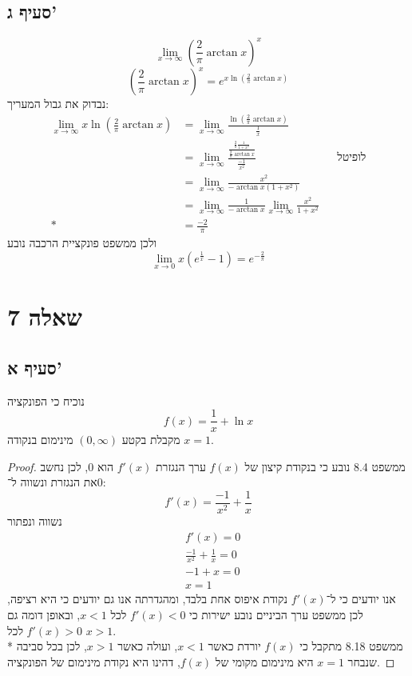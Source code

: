 \subsection{סעיף ג'}
\[
	\lim_{x \to \infty} {\left( \frac{2}{\pi} \arctan x \right)}^x
\]
\[
	{\left( \frac{2}{\pi} \arctan x \right)}^x
	= e^{x \ln \left( \frac{2}{\pi} \arctan x \right)}
\]
נבדוק את גבול המעריך:
\begin{align*}
	\lim_{x \to \infty} x \ln \left( \frac{2}{\pi} \arctan x \right)
	& = \lim_{x \to \infty} \frac{\ln \left( \frac{2}{\pi} \arctan x \right)}{\frac{1}{x}} \\
	& = \lim_{x \to \infty} \frac{\frac{\frac{2}{\pi} \frac{1}{1 + x^2}}{\frac{2}{\pi} \arctan x}}{\frac{-1}{x^2}} && \text{לופיטל} \\
	& = \lim_{x \to \infty} \frac{x^2}{-\arctan x (1 + x^2)} \\
	& = \lim_{x \to \infty} \frac{1}{-\arctan x } \lim_{x \to \infty} \frac{x^2}{1 + x^2} \\*
	& = \frac{-2}{\pi}
\end{align*}
ולכן ממשפט פונקציית הרכבה נובע
\[
	\lim_{x \to 0} x (e^\frac{1}{x} - 1) = e^{-\frac{2}{\pi}}
\]

\section{שאלה 7}
\subsection{סעיף א'}
נוכיח כי הפונקציה
\[
	f(x) = \frac{1}{x} + \ln x
\]
מקבלת בקטע $(0, \infty)$ מינימום בנקודה $x = 1$.
\begin{proof}
	ממשפט 8.4 נובע כי בנקודת קיצון של $f(x)$ ערך הנגזרת $f'(x)$ הוא $0$, לכן נחשב את הנגזרת ונשווה ל־$0$:
	\[
		f'(x) = \frac{-1}{x^2} + \frac{1}{x}
	\]
	נשווה ונפתור
	\begin{align*}
		& f'(x) = 0 \\
		& \frac{-1}{x^2} + \frac{1}{x} = 0 \\
		& -1 + x = 0 \\
		& x = 1
	\end{align*}
	אנו יודעים כי ל־$f'(x)$ נקודת איפוס אחת בלבד, ומהגדרתה אנו גם יודעים כי היא רציפה,
	לכן ממשפט ערך הביניים נובע ישירות כי $f'(x) < 0$ לכל $x < 1$, ובאופן דומה גם $f'(x) > 0$ לכל $x > 1$. \\*
	ממשפט 8.18 מתקבל כי $f(x)$ יורדת כאשר $x < 1$, ועולה כאשר $x > 1$, לכן בכל סביבה שנבחר $x = 1$ היא מינימום מקומי של $f(x)$,
	דהינו היא נקודת מינימום של הפונקציה.
\end{proof}


